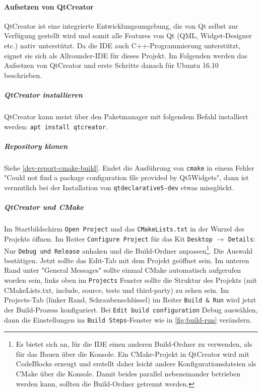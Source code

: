 
\paragraph{Aufsetzen von QtCreator}

QtCreator ist eine integrierte Entwicklungsumgebung, die von Qt selbst zur
Verfügung gestellt wird und somit alle Features von Qt (QML, Widget-Designer
etc.) nativ unterstützt. Da die IDE auch C++-Programmierung unterstützt, eignet
sie sich als Allrounder-IDE für dieses Projekt. Im Folgenden werden das
Aufsetzen von QtCreator und erste Schritte danach für Ubuntu 16.10 beschrieben.

\subparagraph{QtCreator installieren}

QtCreator kann meist über den Paketmanager mit folgendem Befahl installiert werden: \texttt{apt install qtcreator}.

\subparagraph{Repository klonen}

Siehe \autoref{dev-report-cmake-build}. Endet die Ausführung von \texttt{cmake}
in einem Fehler "Could not find a package configuration file provided by
Qt5Widgets", dann ist vermutlich bei der Installation von
\texttt{qtdeclarative5-dev} etwas missglückt.

\subparagraph{QtCreator und CMake}

Im Startbildschirm \texttt{Open Project} und das \texttt{CMakeLists.txt} in der
Wurzel des Projekts öffnen. Im Reiter \texttt{Configure Project} für das Kit
\texttt{Desktop} $\rightarrow$ \texttt{Details}: Nur \texttt{Debug und Release}
anhaken und die Build-Ordner anpassen\footnote{Es bietet sich an, für die IDE
einen anderen Build-Ordner zu verwenden, als für das Bauen über die Konsole. Ein
CMake-Projekt in QtCreator wird mit CodeBlocks erzeugt und erstellt daher leicht
andere Konfigurationsdateien als CMake über die Konsole. Damit beides parallel
nebeneinander betrieben werden kann, sollten die Build-Ordner getrennt werden.}.
Die Auswahl bestätigen. Jetzt sollte das Edit-Tab mit dem Projekt geöffnet sein.
Im unteren Rand unter "General Messages" sollte einmal CMake automatisch
aufgerufen worden sein, links oben im \texttt{Projects} Fenster sollte die
Struktur des Projekts (mit CMakeLists.txt, include, source, tests und
third-party) zu sehen sein. Im Projects-Tab (linker Rand, Schraubenschlüssel) im
Reiter \texttt{Build \& Run} wird jetzt der Build-Prozess konfiguriert. Bei
\texttt{Edit build configuration} Debug auswählen, dann die Einstellungen im
\texttt{Build Steps}-Fenster wie in \autoref{fig:build-run} verändern.

